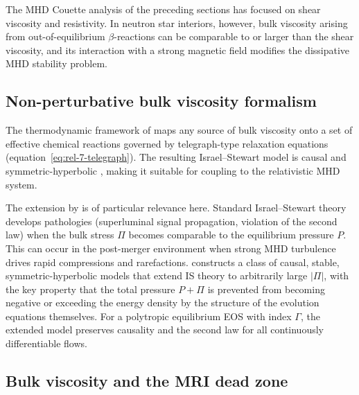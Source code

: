 The MHD Couette analysis of the preceding sections has focused on shear
viscosity and resistivity.  In neutron star interiors, however, bulk
viscosity arising from out-of-equilibrium $\beta$-reactions can be
comparable to or larger than the shear viscosity, and its interaction
with a strong magnetic field modifies the dissipative MHD stability
problem.

\subsection{Non-perturbative bulk viscosity formalism}
\label{sec:rel-9-bulk-formalism}

The thermodynamic framework of \citet{GavassinoBulkViscosity2020} maps
any source of bulk viscosity onto a set of effective chemical reactions
governed by telegraph-type relaxation equations
(equation~\eqref{eq:rel-7-telegraph}).  The resulting Israel--Stewart
model is causal and symmetric-hyperbolic
\citep{GavassinoBulkViscosity2020,GavassinoExtendingIS2025}, making it
suitable for coupling to the relativistic MHD system.

The extension by \citet{GavassinoExtendingIS2025} is of particular
relevance here.  Standard Israel--Stewart theory develops pathologies
(superluminal signal propagation, violation of the second law) when
the bulk stress $\Pi$ becomes comparable to the equilibrium pressure
$P$.  This can occur in the post-merger environment when strong MHD
turbulence drives rapid compressions and rarefactions.
\citet{GavassinoExtendingIS2025} constructs a class of causal,
stable, symmetric-hyperbolic models that extend IS theory to
arbitrarily large $|\Pi|$, with the key property that the total
pressure $P+\Pi$ is prevented from becoming negative or exceeding the
energy density by the structure of the evolution equations themselves.
For a polytropic equilibrium EOS with index $\Gamma$, the extended
model preserves causality and the second law for all continuously
differentiable flows.

\subsection{Bulk viscosity and the MRI dead zone}
\label{sec:rel-9-bulk-MRI}


